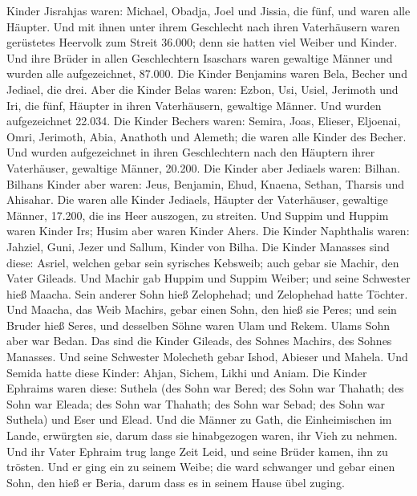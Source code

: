 Kinder Jisrahjas waren: Michael, Obadja, Joel und Jissia, die fünf, und
waren alle Häupter.  Und mit ihnen unter ihrem Geschlecht
nach ihren Vaterhäusern waren gerüstetes Heervolk zum Streit 36.000;
denn sie hatten viel Weiber und Kinder.  Und ihre Brüder in
allen Geschlechtern Isaschars waren gewaltige Männer und wurden alle
aufgezeichnet, 87.000.  Die Kinder Benjamins waren Bela,
Becher und Jediael, die drei.  Aber die Kinder Belas waren:
Ezbon, Usi, Usiel, Jerimoth und Iri, die fünf, Häupter in ihren
Vaterhäusern, gewaltige Männer. Und wurden aufgezeichnet 22.034.
 Die Kinder Bechers waren: Semira, Joas, Elieser, Eljoenai,
Omri, Jerimoth, Abia, Anathoth und Alemeth; die waren alle Kinder des
Becher.  Und wurden aufgezeichnet in ihren Geschlechtern
nach den Häuptern ihrer Vaterhäuser, gewaltige Männer, 20.200.
 Die Kinder aber Jediaels waren: Bilhan. Bilhans Kinder
aber waren: Jeus, Benjamin, Ehud, Knaena, Sethan, Tharsis und Ahisahar.
 Die waren alle Kinder Jediaels, Häupter der Vaterhäuser,
gewaltige Männer, 17.200, die ins Heer auszogen, zu streiten.
 Und Suppim und Huppim waren Kinder Irs; Husim aber waren
Kinder Ahers.  Die Kinder Naphthalis waren: Jahziel, Guni,
Jezer und Sallum, Kinder von Bilha.  Die Kinder Manasses
sind diese: Asriel, welchen gebar sein syrisches Kebsweib; auch gebar
sie Machir, den Vater Gileads.  Und Machir gab Huppim und
Suppim Weiber; und seine Schwester hieß Maacha. Sein anderer Sohn hieß
Zelophehad; und Zelophehad hatte Töchter.  Und Maacha, das
Weib Machirs, gebar einen Sohn, den hieß sie Peres; und sein Bruder hieß
Seres, und desselben Söhne waren Ulam und Rekem.  Ulams
Sohn aber war Bedan. Das sind die Kinder Gileads, des Sohnes Machirs,
des Sohnes Manasses.  Und seine Schwester Molecheth gebar
Ishod, Abieser und Mahela.  Und Semida hatte diese Kinder:
Ahjan, Sichem, Likhi und Aniam.  Die Kinder Ephraims waren
diese: Suthela (des Sohn war Bered; des Sohn war Thahath; des Sohn war
Eleada; des Sohn war Thahath;  des Sohn war Sebad; des Sohn
war Suthela) und Eser und Elead. Und die Männer zu Gath, die
Einheimischen im Lande, erwürgten sie, darum dass sie hinabgezogen
waren, ihr Vieh zu nehmen.  Und ihr Vater Ephraim trug
lange Zeit Leid, und seine Brüder kamen, ihn zu trösten. 
Und er ging ein zu seinem Weibe; die ward schwanger und gebar einen
Sohn, den hieß er Beria, darum dass es in seinem Hause übel zuging.
